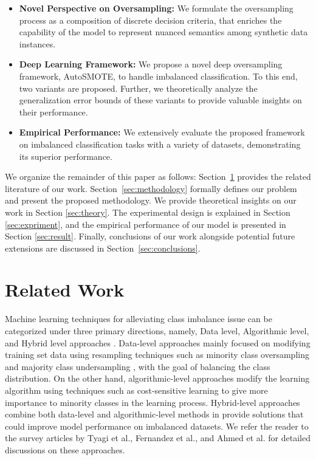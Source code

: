 \begin{itemize}
  \item \textbf{Novel Perspective on Oversampling: } We formulate the oversampling process as a composition of discrete decision criteria, that enriches the capability of the model to represent nuanced semantics among synthetic data instances. 
  \item \textbf{Deep Learning Framework: } We propose a novel deep oversampling framework, AutoSMOTE, to handle imbalanced classification. To this end, two variants are proposed. Further, we theoretically analyze the generalization error bounds of these variants to provide valuable insights on their performance.

  \item \textbf{Empirical Performance: } We extensively evaluate the proposed framework on imbalanced classification tasks with a variety of datasets, demonstrating its superior performance.
\end{itemize}

We organize the remainder of this paper as follows:
Section~\ref{sec:related} provides the related literature of our work.
Section~\ref{sec:methodology} formally defines our problem and present the proposed methodology. We provide theoretical insights on our work in Section \ref{sec:theory}. The experimental design is explained in Section \ref{sec:expriment}, and the empirical performance of our model is presented in Section \ref{sec:result}. Finally, conclusions of our work alongside potential future extensions are discussed in Section~\ref{sec:conclusions}.

\section{Related Work} \label{sec:related}

Machine learning techniques for alleviating class imbalance issue can be categorized under three primary directions, namely, Data level, Algorithmic level, and Hybrid level approaches \cite{sharma2022review,sowah2021hcbst}. Data-level approaches mainly focused on modifying training set data using resampling techniques such as minority class oversampling \cite{gosain2017handling} and majority class undersampling \cite{devi2020review}, with the goal of balancing the class distribution. On the other hand, algorithmic-level approaches modify the learning algorithm using techniques such as cost-sensitive learning \cite{ling2008cost} to give more importance to minority classes in the learning process. Hybrid-level approaches combine both data-level and algorithmic-level methods in provide solutions that could improve model performance on imbalanced datasets. We refer the reader to the survey articles by Tyagi et al.\cite{tyagi2020sampling}, Fernandez et al.\cite{fernandez2018algorithm}, and Ahmed et al.\cite{ahmed2023comparative} for detailed discussions on these approaches.

